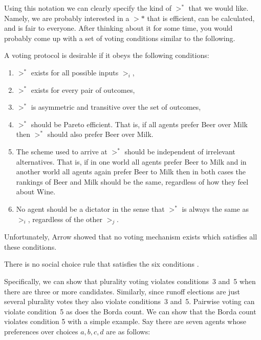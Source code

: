 Using this notation we can clearly specify the kind of $>^*$ that we
would like. Namely, we are probably interested in a $>*$ that is
efficient, can be calculated, and is fair to everyone. After thinking
about it for some time, you would probably come up with a set of
voting conditions similar to the following.

\begin{definition} A voting
  protocol is desirable if it obeys the following conditions:
  \begin{enumerate}
  \item $>^*$ exists for all possible inputs $>_i$,
    
  \item $>^*$ exists for every pair of outcomes,
    
  \item $>^*$ is asymmetric and transitive over the
    set of outcomes,
    
  \item $>^*$ should be Pareto efficient. That is, if all
      agents prefer Beer over Milk then $>^*$ should also prefer
      Beer over Milk.
    
  \item The scheme used to arrive at $>^*$ should be independent of
    irrelevant alternatives. That is, if in one world all
      agents prefer Beer to Milk and in another world all agents
      again prefer Beer to Milk then in both cases the rankings of
      Beer and Milk should be the same, regardless of how they feel
      about Wine.
    
  \item No agent should be a dictator in the sense that $>^*$ is
    always the same as $>_i$, regardless of the other $>_j$.
    
  \end{enumerate}    
\end{definition}

Unfortunately, Arrow showed that no voting mechanism exists which
satisfies all these conditions.  

\begin{theorem}
  There is no social choice rule that satisfies the six
  conditions \cite{arrow51a}.
\end{theorem}
Specifically, we can show that plurality voting violates conditions~3
and~5 when there are three or more candidates. Similarly, since runoff
elections are just several plurality votes they also violate
conditions~3 and~5. Pairwise voting can violate condition~5 as does
the Borda count. We can show that the Borda count violates condition 5
with a simple example. Say there are seven agents whose preferences
over choices $a, b, c, d$ are as follows:

